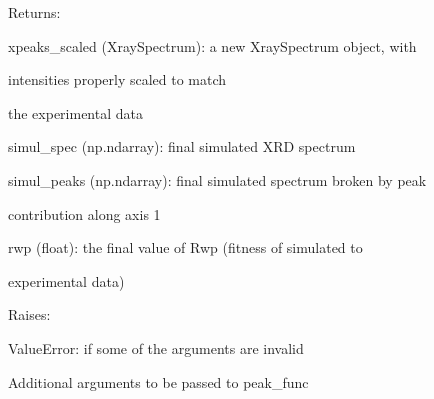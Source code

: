 \documentclass[letterpaper,10pt,english]{sphinxmanual}
\begin{document}
\begin{fulllineitems}
\begin{fulllineitems}
\begin{DUlineblock}{0em}
\item[] Returns:
\item[]
\begin{DUlineblock}{\DUlineblockindent}
\item[] xpeaks\_scaled (XraySpectrum): a new XraySpectrum object, with
\item[]
\begin{DUlineblock}{\DUlineblockindent}
\item[] intensities properly scaled to match
\item[] the experimental data
\end{DUlineblock}
\item[] simul\_spec (np.ndarray): final simulated XRD spectrum
\item[] simul\_peaks (np.ndarray): final simulated spectrum broken by peak
\item[]
\begin{DUlineblock}{\DUlineblockindent}
\item[] contribution along axis 1
\end{DUlineblock}
\item[] rwp (float): the final value of Rwp (fitness of simulated to
\item[]
\begin{DUlineblock}{\DUlineblockindent}
\item[] experimental data)
\end{DUlineblock}
\end{DUlineblock}
\end{DUlineblock}

\begin{DUlineblock}{0em}
\item[] Raises:
\item[]
\begin{DUlineblock}{\DUlineblockindent}
\item[] ValueError: if some of the arguments are invalid
\end{DUlineblock}
\end{DUlineblock}

\end{fulllineitems}


\begin{fulllineitems}
\label{doctree/soprano.calculate.xrd.xrd:soprano.calculate.xrd.xrd.XRDCalculator.peak_f_args}
Additional arguments to be passed to peak\_func


\end{fulllineitems}
\end{fulllineitems}
\end{document}
